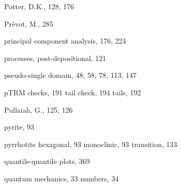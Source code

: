 \documentclass[,plain]{tauxe}
\begin{document}
\begin{theindex}
  \item Potter, D.K., 128, 176
  \item Pr\'evot, M., 285
  \item principal component analysis, 176, 224
  \item processes, post-depositional, 121
  \item pseudo-single domain, 48, 58, 78, 113, 147
  \item pTRM
    \subitem checks, 191
    \subitem tail check, 194
    \subitem tails, 192
  \item Pullaiah, G., 125, 126
  \item pyrite, 93
  \item pyrrhotite
    \subitem hexagonal, 93
    \subitem monoclinic, 93
    \subitem transition, 133

  \indexspace

  \item quantile-quantile plots, 369
  \item quantum
    \subitem mechanics, 33
    \subitem numbers, 34

  \indexspace


\end{theindex}
\end{document}
